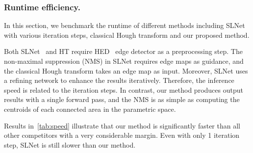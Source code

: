 \documentclass[10pt,journal,cspaper,compsoc]{IEEEtran}
\newcommand{\revise}[1]{{\textcolor{black}{#1}}}
\newcommand{\CheckRmv}[1]{}
\newcommand{\CheckRmv}[1]{#1}
\begin{document}
\CheckRmv{
\begin{figure*}[tb!]
  \begin{center}
  \begin{overpic}[width=1.0 \linewidth]{figures/sl6500_results.pdf}
  \end{overpic}
  \end{center}
  \vspace{-12pt}
  \caption{
    Detection results of our method on the \revise{NKL} dataset.
Our method produces results that are visually compatible with human perception.
  }
  \label{fig:detections-NKL}
\end{figure*}
}

\subsubsection{Runtime efficiency.}
In this section, we benchmark the runtime of different methods including SLNet~\cite{lee2017semantic}
with various iteration steps, classical Hough transform and our proposed method.

Both SLNet~\cite{lee2017semantic} and HT require HED~\cite{xie2015holistically}
edge detector as a preprocessing step.
The non-maximal suppression (NMS) in SLNet requires edge maps as guidance,
and the classical Hough transform takes an edge map as input.
Moreover, SLNet uses a refining network to enhance the results iteratively.
Therefore, the inference speed is related to the iteration  steps.
In contrast, our method produces output results with a single forward pass,
and the NMS is as simple as computing the centroids of each connected area
in the parametric space.

Results in~\cref{tab:speed} illustrate that our method is significantly faster than
all other competitors with a very considerable margin.
Even with only 1 iteration step, SLNet is still slower than our method.
\end{document}

